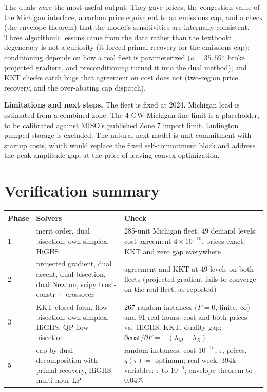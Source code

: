\documentclass[11pt]{article}
\begin{document}
The duals were the most useful output. They gave prices, the congestion value of the Michigan interface, a carbon price equivalent to an emissions cap, and a check (the envelope theorem) that the model's sensitivities are internally consistent. Three algorithmic lessons came from the data rather than the textbook: degeneracy is not a curiosity (it forced primal recovery for the emissions cap); conditioning depends on how a real fleet is parameterized ($\kappa = 35{,}594$ broke projected gradient, and preconditioning turned it into the dual method); and KKT checks catch bugs that agreement on cost does not (two-region price recovery, and the over-abating cap dispatch).

\textbf{Limitations and next steps.} The fleet is fixed at 2024. Michigan load is estimated from a combined zone. The 4 GW Michigan line limit is a placeholder, to be calibrated against MISO's published Zone 7 import limit. Ludington pumped storage is excluded. The natural next model is unit commitment with startup costs, which would replace the fixed self-commitment block and address the peak amplitude gap, at the price of leaving convex optimization.

\appendix
\section{Verification summary}

\begin{center}
\begin{tabularx}{\textwidth}{@{}l X X@{}}
\toprule
Phase & Solvers & Check \\
\midrule
1 & merit order, dual bisection, own simplex, HiGHS & 285-unit Michigan fleet, 49 demand levels: cost agreement $4\times 10^{-10}$, prices exact, KKT and zero gap everywhere \\
2 & projected gradient, dual ascent, dual bisection, dual Newton, scipy trust-constr + crossover & agreement and KKT at 49 levels on both fleets (projected gradient fails to converge on the real fleet, as reported) \\
3 & KKT closed form, flow bisection, own simplex, HiGHS, QP flow bisection & 267 random instances ($F = 0$, finite, $\infty$) and 91 real hours: cost and both prices vs.\ HiGHS, KKT, duality gap; $\partial \text{cost}/\partial F = -(\lambda_M - \lambda_R)$ \\
5 & cap by dual decomposition with primal recovery, HiGHS multi-hour LP & random instances: cost $10^{-15}$, $\tau$, prices, $q(\tau) = $ optimum; real week, 394k variables: $\tau$ to $10^{-6}$; envelope theorem to 0.04\% \\
\bottomrule
\end{tabularx}
\end{center}
\end{document}
